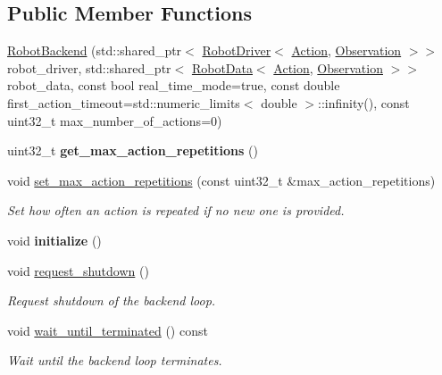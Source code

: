 \subsection*{Public Member Functions}
\begin{DoxyCompactItemize}
\item 
\hyperlink{classrobot__interfaces_1_1RobotBackend_af454a09b5d269ed32b0ae2d35abdb833}{Robot\+Backend} (std\+::shared\+\_\+ptr$<$ \hyperlink{classrobot__interfaces_1_1RobotDriver}{Robot\+Driver}$<$ \hyperlink{classAction}{Action}, \hyperlink{classObservation}{Observation} $>$$>$ robot\+\_\+driver, std\+::shared\+\_\+ptr$<$ \hyperlink{classrobot__interfaces_1_1RobotData}{Robot\+Data}$<$ \hyperlink{classAction}{Action}, \hyperlink{classObservation}{Observation} $>$$>$ robot\+\_\+data, const bool real\+\_\+time\+\_\+mode=true, const double first\+\_\+action\+\_\+timeout=std\+::numeric\+\_\+limits$<$ double $>$\+::infinity(), const uint32\+\_\+t max\+\_\+number\+\_\+of\+\_\+actions=0)
\item 
uint32\+\_\+t {\bfseries get\+\_\+max\+\_\+action\+\_\+repetitions} ()\hypertarget{classrobot__interfaces_1_1RobotBackend_ae354dfd960d4fd0d2f9242dcfb4a701f}{}\label{classrobot__interfaces_1_1RobotBackend_ae354dfd960d4fd0d2f9242dcfb4a701f}

\item 
void \hyperlink{classrobot__interfaces_1_1RobotBackend_aad761d1e0ab7296a9632b9c4cc9c91db}{set\+\_\+max\+\_\+action\+\_\+repetitions} (const uint32\+\_\+t \&max\+\_\+action\+\_\+repetitions)
\begin{DoxyCompactList}\small\item\em Set how often an action is repeated if no new one is provided. \end{DoxyCompactList}\item 
void {\bfseries initialize} ()\hypertarget{classrobot__interfaces_1_1RobotBackend_a7e4eb9f5362b79c0c21b824e3b639ae6}{}\label{classrobot__interfaces_1_1RobotBackend_a7e4eb9f5362b79c0c21b824e3b639ae6}

\item 
void \hyperlink{classrobot__interfaces_1_1RobotBackend_a3da1748227b56acf7b745aff64023715}{request\+\_\+shutdown} ()
\begin{DoxyCompactList}\small\item\em Request shutdown of the backend loop. \end{DoxyCompactList}\item 
void \hyperlink{classrobot__interfaces_1_1RobotBackend_acc6fd15379502943f99b58bad9b0acf7}{wait\+\_\+until\+\_\+terminated} () const \hypertarget{classrobot__interfaces_1_1RobotBackend_acc6fd15379502943f99b58bad9b0acf7}{}\label{classrobot__interfaces_1_1RobotBackend_acc6fd15379502943f99b58bad9b0acf7}

\begin{DoxyCompactList}\small\item\em Wait until the backend loop terminates. \end{DoxyCompactList}\end{DoxyCompactItemize}
